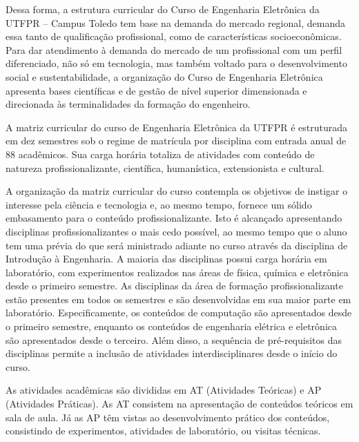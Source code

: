 Dessa forma, a estrutura curricular do Curso de Engenharia Eletrônica da UTFPR – Campus Toledo tem base na demanda do mercado regional, demanda essa tanto de qualificação profissional, como de características socioeconômicas. Para dar atendimento à demanda do mercado de um profissional com um perfil diferenciado, não só em tecnologia, mas também voltado para o desenvolvimento social e sustentabilidade, a organização do Curso de Engenharia Eletrônica apresenta bases científicas e de gestão de nível superior dimensionada e direcionada às terminalidades da formação do engenheiro.

A matriz curricular do curso de Engenharia Eletrônica da UTFPR é estruturada em dez semestres sob o regime de matrícula por disciplina com entrada anual de 88 acadêmicos. Sua carga horária totaliza  de atividades com conteúdo de natureza profissionalizante, científica, humanística, extensionista e cultural.

A organização da matriz curricular do curso contempla os objetivos de instigar o interesse pela ciência e tecnologia e, ao mesmo tempo, fornece um sólido embasamento para o conteúdo profissionalizante. Isto é alcançado apresentando disciplinas profissionalizantes o mais cedo possível, ao mesmo tempo que o aluno tem uma prévia do que será ministrado adiante no curso através da disciplina de Introdução à Engenharia. A maioria das disciplinas possui carga horária em laboratório, com experimentos realizados nas áreas de física, química e eletrônica desde o primeiro semestre. As disciplinas da área de formação profissionalizante estão presentes em todos os semestres e são desenvolvidas em sua maior parte em laboratório. Especificamente, os conteúdos de computação são apresentados desde o primeiro semestre, enquanto os conteúdos de engenharia elétrica e eletrônica são apresentados desde o terceiro. Além disso, a sequência de pré-requisitos das disciplinas permite a inclusão de atividades interdisciplinares desde o início do curso.

As atividades acadêmicas são divididas em AT (Atividades Teóricas) e AP (Atividades Práticas). As AT consistem na apresentação de conteúdos teóricos em sala de aula. Já as AP têm vistas ao desenvolvimento prático dos conteúdos, consistindo de experimentos, atividades de laboratório, ou visitas técnicas.



